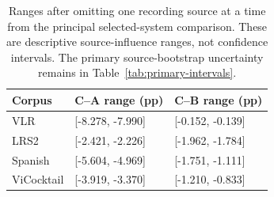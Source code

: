 \begin{table}[tb]
\centering\small
\caption{Ranges after omitting one recording source at a time from the principal selected-system comparison. These are descriptive source-influence ranges, not confidence intervals. The primary source-bootstrap uncertainty remains in Table~\ref{tab:primary-intervals}.}
\label{tab:source-influence}
\begin{tabular}{lll}
\toprule
Corpus & C--A range (pp) & C--B range (pp) \\
\midrule
VLR & [-8.278, -7.990] & [-0.152, -0.139] \\
LRS2 & [-2.421, -2.226] & [-1.962, -1.784] \\
Spanish & [-5.604, -4.969] & [-1.751, -1.111] \\
ViCocktail & [-3.919, -3.370] & [-1.210, -0.833] \\
\bottomrule
\end{tabular}
\end{table}
